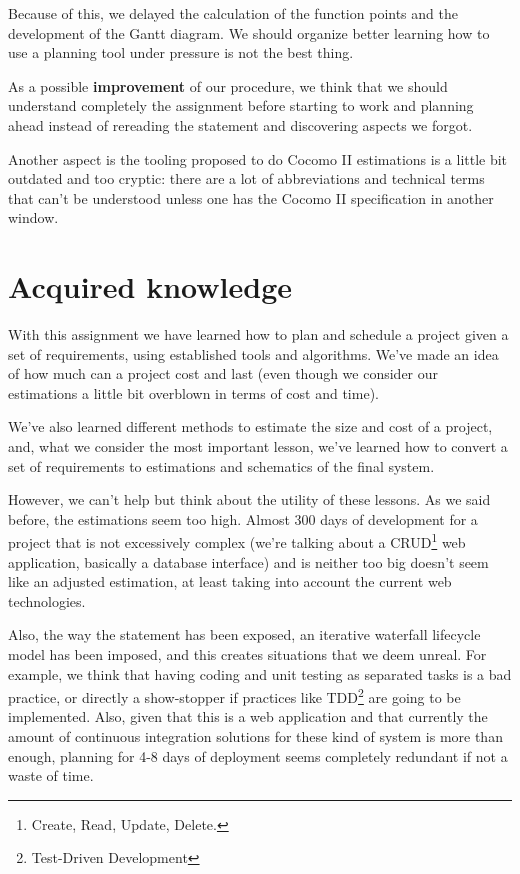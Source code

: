 \documentclass{article}
\begin{document}
Because of this, we delayed the calculation of the function points and the development of the Gantt diagram. We should organize better learning how to use a planning tool under pressure is not the best thing.

As a possible \textbf{improvement} of our procedure, we think that we should understand completely the assignment before starting to work and planning ahead instead of rereading the statement and discovering aspects we forgot.

Another aspect is the tooling proposed to do Cocomo II estimations is a little bit outdated and too cryptic: there are a lot of abbreviations and technical terms that can't be understood unless one has the Cocomo II specification in another window.

\section{Acquired knowledge}

With this assignment we have learned how to plan and schedule a project given a set of requirements, using established tools and algorithms. We've made an idea of how much can a project cost and last (even though we consider our estimations a little bit overblown in terms of cost and time).

We've also learned different methods to estimate the size and cost of a project, and, what we consider the most important lesson, we've learned how to convert a set of requirements to estimations and schematics of the final system.

However, we can't help but think about the utility of these lessons. As we said before, the estimations seem too high. Almost 300 days of development for a project that is not excessively complex (we're talking about a CRUD\footnote{Create, Read, Update, Delete.} web application, basically a database interface) and is neither too big doesn't seem like an adjusted estimation, at least taking into account the current web technologies.

Also, the way the statement has been exposed, an iterative waterfall lifecycle model has been imposed, and this creates situations that we deem unreal. For example, we think that having coding and unit testing as separated tasks is a bad practice, or directly a show-stopper if practices like TDD\footnote{Test-Driven Development} are going to be implemented. Also, given that this is a web application and that currently the amount of continuous integration solutions for these kind of system is more than enough, planning for 4-8 days of deployment seems completely redundant if not a waste of time.
\end{document}
